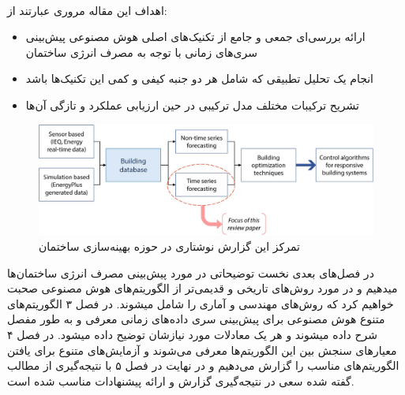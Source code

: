 \\[3em]
\noindent
اهداف این مقاله مروری عبارتند از:
\begin{itemize}
    \item ارائه بررسی‌ای جمعی و جامع از تکنیک‌های اصلی هوش مصنوعی پیش‌بینی سری‌های ‌ز‌‌مانی با توجه به مصرف انرژی ساختمان
    \item انجام یک تحلیل تطبیقی که شامل هر دو جنبه کیفی و کمی این تکنیک‌ها باشد
    \item تشریح ترکیبات مختلف مدل ترکیبی در حین ارزیابی عملکرد و تازگی آن‌ها
\end{itemize}
\begin{figure}[ht!]
    \begin{center}
        \includegraphics[width=14cm]{images/illustration.jpg}
    \end{center}
    \caption[‌اهمیت پیش‌بینی انرژی ساختمان‌ها برای بهینه سازی ساختمان‌ها]{تمرکز این گزارش نوشتاری در حوزه بهینه‌سازی ساختمان
     \cite{DEB2017902}}
    \label{fig:dc}
    \end{figure}

\noindent
در فصل‌های بعدی نخست توضیحاتی در مورد پیش‌بینی مصرف انرژی ساختمان‌ها میدهیم و در مورد روش‌های تاریخی و قدیمی‌تر از 
الگوریتم‌های هوش‌ مصنوعی صحبت خواهیم کرد که روش‌های مهندسی و آماری را شامل میشوند. در فصل ۳ الگوریتم‌های متنوع هوش مصنوعی برای پیش‌بینی سری داده‌های زمانی معرفی و به طور مفصل شرح داده میشوند و هر یک 
معادلات مورد نیازشان توضیح داده میشود. در فصل ۴ معیار‌های سنجش بین این الگوریتم‌ها معرفی می‌شوند و آزمایش‌های متنوع 
برای یافتن الگوریتم‌های مناسب را گزارش می‌دهیم و در نهایت در فصل ۵ با نتیجه‌گیری از مطالب گفته شده سعی در نتیجه‌گیری گزارش و ارائه پیشنهادات مناسب شده است.